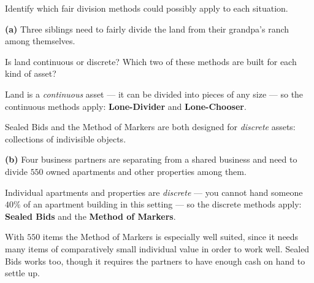 \documentclass[12pt]{ximera}
\begin{document}
\begin{problem}
Identify which fair division methods could possibly apply to each situation.

\begin{prompt}
\textbf{(a)} Three siblings need to fairly divide the land from their grandpa's ranch
among themselves.

\begin{selectAll}
\end{selectAll}

\begin{hint}
Is land continuous or discrete? Which two of these methods are built for each kind of
asset?
\end{hint}

\begin{solution}
Land is a \emph{continuous} asset --- it can be divided into pieces of any size --- so
the continuous methods apply: \textbf{Lone-Divider} and \textbf{Lone-Chooser}.

Sealed Bids and the Method of Markers are both designed for \emph{discrete} assets:
collections of indivisible objects.
\end{solution}
\end{prompt}

\begin{prompt}
\textbf{(b)} Four business partners are separating from a shared business and need to
divide $550$ owned apartments and other properties among them.

\begin{selectAll}
\end{selectAll}

\begin{solution}
Individual apartments and properties are \emph{discrete} --- you cannot hand someone
$40\%$ of an apartment building in this setting --- so the discrete methods apply:
\textbf{Sealed Bids} and the \textbf{Method of Markers}.

With $550$ items the Method of Markers is especially well suited, since it needs many
items of comparatively small individual value in order to work well. Sealed Bids works
too, though it requires the partners to have enough cash on hand to settle up.
\end{solution}
\end{prompt}
\end{problem}
\end{document}
